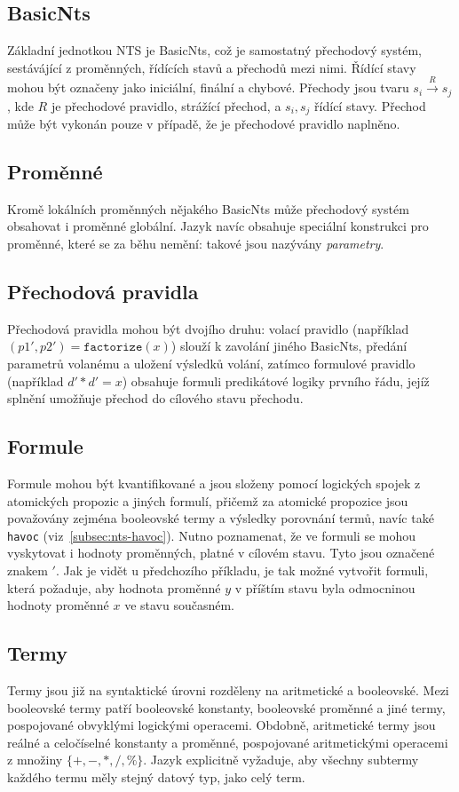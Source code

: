\documentclass[12pt]{fithesis2}
\begin{document}
\subsection{BasicNts}
Základní jednotkou NTS je BasicNts, což je samostatný přechodový systém, sestávájící z proměnných, řídících stavů a přechodů mezi nimi. Řídící stavy mohou být označeny jako iniciální, finální a chybové. Přechody jsou tvaru $s_i \overset{R}{\rightarrow} s_j$, kde $R$ je přechodové pravidlo, strážící přechod, a $s_i, s_j$ řídící stavy. Přechod může být vykonán pouze v případě, že je přechodové pravidlo naplněno.

\subsection{Proměnné}
Kromě lokálních proměnných nějakého BasicNts může přechodový systém obsahovat i proměnné globální. Jazyk navíc obsahuje speciální konstrukci pro proměnné, které se za běhu nemění: takové jsou nazývány \textit{parametry}.

\subsection{Přechodová pravidla}
Přechodová pravidla mohou být dvojího druhu: volací pravidlo (například  $(p1',p2') = \texttt{factorize} (x)$) slouží k zavolání jiného BasicNts, předání parametrů volanému a uložení výsledků volání, zatímco formulové pravidlo (například $d' * d' = x$) obsahuje formuli predikátové logiky prvního řádu, jejíž splnění umožňuje přechod do cílového stavu přechodu. 

\subsection{Formule}
Formule mohou být kvantifikované a jsou složeny pomocí logických spojek z atomických propozic a jiných formulí, přičemž za atomické propozice jsou považovány zejména booleovské termy a výsledky porovnání termů, navíc také \texttt{havoc} (viz~\ref{subsec:nts-havoc}). Nutno poznamenat, že ve formuli se mohou vyskytovat i hodnoty proměnných, platné v cílovém stavu. Tyto jsou označené znakem $'$. Jak je vidět u předchozího příkladu, je tak možné vytvořit formuli, která požaduje, aby hodnota proměnné $y$ v příštím stavu byla odmocninou hodnoty proměnné $x$ ve stavu současném.

\subsection{Termy}
Termy jsou již na syntaktické úrovni rozděleny na aritmetické a booleovské. Mezi booleovské termy patří booleovské konstanty, booleovské proměnné a jiné termy, pospojované obvyklými logickými operacemi. Obdobně, aritmetické termy jsou reálné a celočíselné konstanty a proměnné, pospojované aritmetickými operacemi z množiny $\{+, -, *, /, \% \}$. Jazyk explicitně vyžaduje, aby všechny subtermy každého termu měly stejný datový typ, jako celý term.
\end{document}
